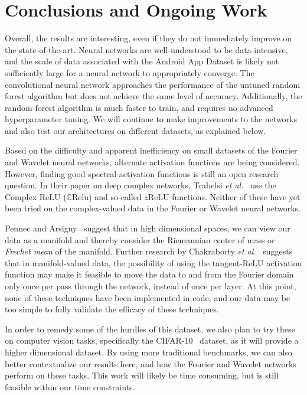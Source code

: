 \documentclass[10pt]{article}
\begin{document}
\section{Conclusions and Ongoing Work}
Overall, the results are interesting, even if they do not immediately improve on the state-of-the-art. 
Neural networks are well-understood to be data-intensive, and the scale of data associated with the Android App Dataset is likely not sufficiently large for a neural network to appropriately converge. 
The convolutional neural network approaches the performance of the untuned random forest algorithm but does not achieve the same level of accuracy.
Additionally, the random forest algorithm is much faster to train, and requires no advanced hyperparameter tuning.
We will continue to make improvements to the networks and also test our architectures on different datasets, as explained below.

Based on the difficulty and apparent inefficiency on small datasets of the Fourier and Wavelet neural networks, alternate activation functions are being considered. 
However, finding good spectral activation functions is still an open research question.
In their paper on deep complex networks, Trabelsi \textit{et al.}~\cite{trabelsi2017deep} use the Complex ReLU ($\mathbb{C}$Relu) and so-called $z$ReLU functions. 
Neither of these have yet been tried on the complex-valued data in the Fourier or Wavelet neural networks.

Pennec and Arsigny~\cite{pennec2013information} suggest that in high dimensional spaces, we can view our data as a manifold and thereby consider the Riemannian center of mass or \textit{Frechet mean} of the manifold.
Further research by Chakraborty \textit{et al.}~\cite{chakraborty2019surreal} suggests that in manifold-valued data, the possibility of using the tangent-ReLU activation function may make it feasible to move the data to and from the Fourier domain only once per pass through the network, instead of once per layer.
At this point, none of these techniques have been implemented in code, and our data may be too simple to fully validate the efficacy of these techniques.

In order to remedy some of the hurdles of this dataset, we also plan to try these on computer vision tasks, specifically the CIFAR-10~\cite{krizhevsky2009learning} dataset, as it will provide a higher dimensional dataset. 
By using more traditional benchmarks, we can also better contextualize our results here, and how the Fourier and Wavelet networks perform on these tasks.
This work will likely be time consuming, but is still feasible within our time constraints.
\end{document}
